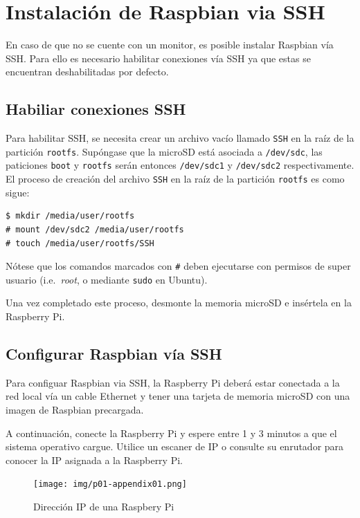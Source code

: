 \documentclass[letterpaper,10.5pt]{article}
\begin{document}
%
%
\appendix%
\section{Instalación de Raspbian via SSH}%
\label{sec:annex1}
En caso de que no se cuente con un monitor, es posible instalar Raspbian vía SSH. %
Para ello es necesario habilitar conexiones vía SSH ya que estas se encuentran deshabilitadas por defecto.


\subsection{Habiliar conexiones SSH}
\label{sec:annex1-ssh-enable}
Para habilitar SSH, se necesita crear un archivo vacío llamado \texttt{SSH} en la raíz de la partición \texttt{rootfs}.
Supóngase que la microSD está asociada a \texttt{/dev/sdc}, las paticiones \texttt{boot} y \texttt{rootfs} serán entonces \texttt{/dev/sdc1} y \texttt{/dev/sdc2} respectivamente.
El proceso de creación del archivo \texttt{SSH} en la raíz de la partición \texttt{rootfs} es como sigue:

\begin{Verbatim}[fontsize=\footnotesize]
$ mkdir /media/user/rootfs
# mount /dev/sdc2 /media/user/rootfs
# touch /media/user/rootfs/SSH
\end{Verbatim}

Nótese que los comandos marcados con \texttt{\#} deben ejecutarse con permisos de super usuario (i.e.~\emph{root}, o mediante \texttt{sudo} en Ubuntu).

Una vez completado este proceso, desmonte la memoria microSD e insértela en la Raspberry Pi.

\subsection{Configurar Raspbian vía SSH}
Para configuar Raspbian via SSH, la Raspberry Pi deberá estar conectada a la red local vía un cable Ethernet y tener una tarjeta de memoria microSD con una imagen de Raspbian precargada.

A continuación, conecte la Raspberry Pi y espere entre 1 y 3 minutos a que el sistema operativo cargue.
Utilice un escaner de IP o consulte su enrutador para conocer la IP asignada a la Raspberry Pi.

\begin{figure}[H]
	\centering%
	\texttt{[image: img/p01-appendix01.png]} %
	\caption{Dirección IP de una Raspbery Pi}
	\label{fig:raspberry-ip} %
\end{figure}
\end{document}
